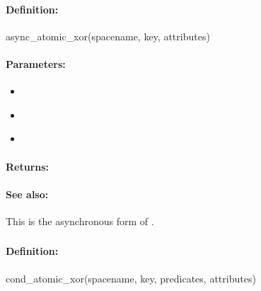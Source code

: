 \paragraph{Definition:}
\begin{rubycode}
async_atomic_xor(spacename, key, attributes)
\end{rubycode}

\paragraph{Parameters:}
\begin{itemize}[noitemsep]
\item {}\\

\item {}\\

\item {}\\

\end{itemize}

\paragraph{Returns:}


\paragraph{See also:}  This is the asynchronous form of .

\pagebreak
\subsubsection{}
\label{api:ruby:cond_atomic_xor}


\paragraph{Definition:}
\begin{rubycode}
cond_atomic_xor(spacename, key, predicates, attributes)
\end{rubycode}

